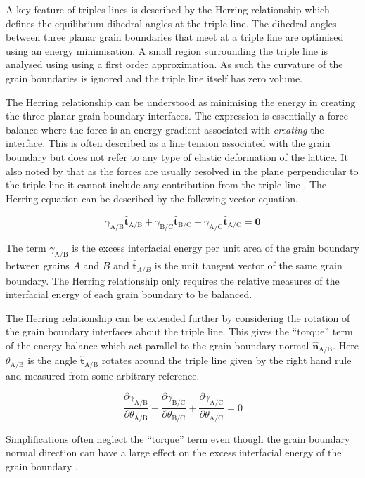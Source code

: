 \documentclass[12pt,a4paper,openany]{report}
\newcommand{\ts}[1]{\textrm{#1}}
\begin{document}
A key feature of triples lines is described by the Herring relationship which defines the equilibrium dihedral angles at the triple line. The dihedral angles between three planar grain boundaries that meet at a triple line are optimised using an energy minimisation. A small region surrounding the triple line is analysed using using a first order approximation. As such the curvature of the grain boundaries is ignored and the triple line itself has zero volume. 

The Herring relationship can be understood as minimising the energy in creating the three planar grain boundary interfaces. The expression is essentially a force balance where the force is an energy gradient associated with \emph{creating} the interface. This is often described as a line tension associated with the grain boundary but does not refer to any type of elastic deformation of the lattice. It also noted by \citeauthor{CRAIGCARTER} that as the forces are usually resolved in the plane perpendicular to the triple line it cannot include any contribution from the triple line \cite{CRAIGCARTER}. The Herring equation can be described by the following vector equation.
     
\[\gamma_{\ts{A/B}}\mathbf{\hat{t}}_{\ts{A/B}} + \gamma_{\ts{B/C}}\mathbf{\hat{t}}_{\ts{B/C}} + \gamma_{\ts{A/C}}\mathbf{\hat{t}}_{\ts{A/C}} =\mathbf{0} \]

The term $\gamma_{\ts{A/B}}$ is the excess interfacial energy per unit area of the grain boundary between grains $A$ and $B$ and $\mathbf{\hat{t}}_{A/B}$ is the unit tangent vector of the same grain boundary. The Herring relationship only requires the relative measures of the interfacial energy of each grain boundary to be balanced.

The Herring relationship can be extended further by considering the rotation of the grain boundary interfaces about the triple line. This gives the ``torque'' term of the energy balance which act parallel to the grain boundary normal $\mathbf{\hat{n}}_{\ts{A/B}}$. Here $\theta_{\ts{A/B}}$ is the angle $\mathbf{\hat{t}}_{\ts{A/B}}$ rotates around the triple line given by the right hand rule and measured from some arbitrary reference. 

\[\frac{\partial \gamma_{\ts{A/B}}}{\partial \theta_{\ts{A/B}}} +\frac{\partial \gamma_{\ts{B/C}}}{\partial \theta_{\ts{B/C}}}+\frac{\partial \gamma_{\ts{A/C}}}{\partial \theta_{\ts{A/C}}} =0\]


Simplifications often neglect the ``torque''  term even though the grain boundary normal direction can have a large effect on the excess interfacial energy of the grain boundary \cite{Rowenhurst}.
\end{document}

